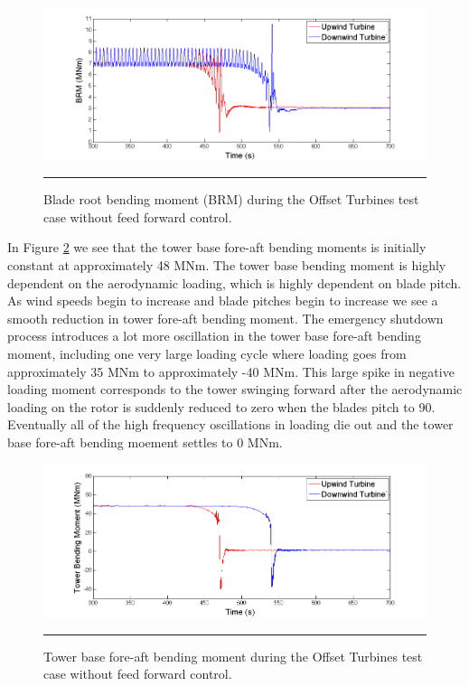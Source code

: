 \begin{figure}[htbp] \label{fig6-18}
	\centering
		\includegraphics[trim = {1cm 0 2cm 0}, clip, width = \linewidth]{Figures/ch6Figures/fig6-18.png}
		\rule{35em}{0.5pt}
	\caption{Blade root bending moment (BRM) during the Offset Turbines test case without feed forward control.}
\end{figure}

In Figure \ref{fig6-19} we see that the tower base fore-aft bending moments is initially constant at approximately 48 MNm. The tower base bending moment is highly dependent on the aerodynamic loading, which is highly dependent on blade pitch. As wind speeds begin to increase and blade pitches begin to increase we see a smooth reduction in tower fore-aft bending moment. The emergency shutdown process introduces a lot more oscillation in the tower base fore-aft bending moment, including one very large loading cycle where loading goes from approximately 35 MNm to approximately -40 MNm. This large spike in negative loading moment corresponds to the tower swinging forward after the aerodynamic loading on the rotor is suddenly reduced to zero when the blades pitch to 90\degree. Eventually all of the high frequency oscillations in loading die out and the tower base fore-aft bending moement settles to 0 MNm.

\begin{figure}[htbp] \label{fig6-19}
	\centering
		\includegraphics[trim = {1cm 0 2cm 0}, clip, width = \linewidth]{Figures/ch6Figures/fig6-19.png}
		\rule{35em}{0.5pt}
	\caption{Tower base fore-aft bending moment during the Offset Turbines test case without feed forward control.}
\end{figure}

